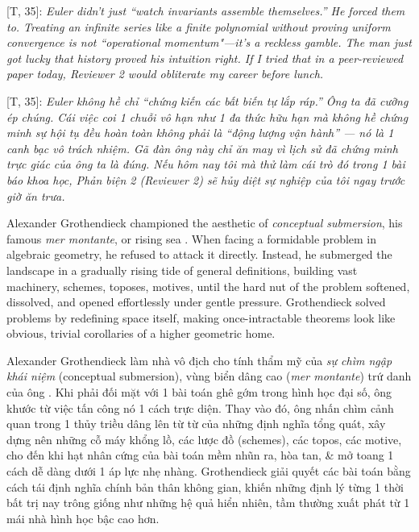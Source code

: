 \documentclass[11pt]{article}
\begin{document}
\vspace{2mm}
\textsf{[T, 35]:} \textit{Euler didn't just ``watch invariants assemble themselves.'' He forced them to. Treating an infinite series like a finite polynomial without proving uniform convergence is not ``operational momentum"—it's a reckless gamble. The man just got lucky that history proved his intuition right. If I tried that in a peer-reviewed paper today, Reviewer 2 would obliterate my career before lunch.}

\textsf{[T, 35]:} \textit{Euler không hề chỉ ``chứng kiến các bất biến tự lắp ráp.'' Ông ta đã cưỡng ép chúng. Cái việc coi 1 chuỗi vô hạn như 1 đa thức hữu hạn mà không hề chứng minh sự hội tụ đều hoàn toàn không phải là ``động lượng vận hành'' — nó là 1 canh bạc vô trách nhiệm. Gã đàn ông này chỉ ăn may vì lịch sử đã chứng minh trực giác của ông ta là đúng. Nếu hôm nay tôi mà thử làm cái trò đó trong 1 bài báo khoa học, Phản biện 2 (Reviewer 2) sẽ hủy diệt sự nghiệp của tôi ngay trước giờ ăn trưa.}
\vspace{2mm}

Alexander Grothendieck championed the aesthetic of \emph{conceptual submersion}, his famous \textit{mer montante}, or rising sea \cite{grothendieck1986recoltes}. When facing a formidable problem in algebraic geometry, he refused to attack it directly. Instead, he submerged the landscape in a gradually rising tide of general definitions, building vast machinery, schemes, toposes, motives, until the hard nut of the problem softened, dissolved, and opened effortlessly under gentle pressure. Grothendieck solved problems by redefining space itself, making once-intractable theorems look like obvious, trivial corollaries of a higher geometric home.

Alexander Grothendieck làm nhà vô địch cho tính thẩm mỹ của \emph{sự chìm ngập khái niệm} (conceptual submersion), vùng biển dâng cao (\textit{mer montante}) trứ danh của ông \cite{grothendieck1986recoltes}. Khi phải đối mặt với 1 bài toán ghê gớm trong hình học đại số, ông khước từ việc tấn công nó 1 cách trực diện. Thay vào đó, ông nhấn chìm cảnh quan trong 1 thủy triều dâng lên từ từ của những định nghĩa tổng quát, xây dựng nên những cỗ máy khổng lồ, các lược đồ (schemes), các topos, các motive, cho đến khi hạt nhân cứng của bài toán mềm nhũn ra, hòa tan, \& mở toang 1 cách dễ dàng dưới 1 áp lực nhẹ nhàng. Grothendieck giải quyết các bài toán bằng cách tái định nghĩa chính bản thân không gian, khiến những định lý từng 1 thời bất trị nay trông giống như những hệ quả hiển nhiên, tầm thường xuất phát từ 1 mái nhà hình học bậc cao hơn.
\end{document}
